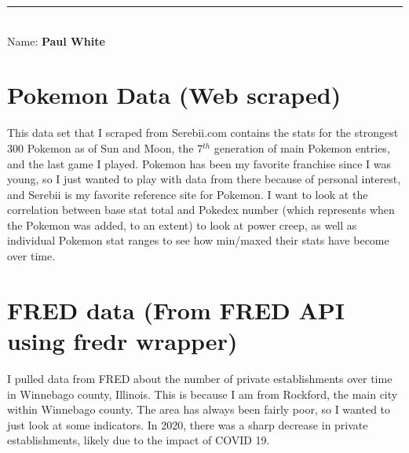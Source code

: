 \documentclass[11pt,a4paper]{article}
\newcommand{\student}{\textbf{Paul White}}
\begin{document}
\thispagestyle{empty}
\begin{center}
\end{center}
\noindent
\rule{17cm}{0.2cm}\\[0.3cm]
Name: \student 



\section{Pokemon Data (Web scraped)}
    This data set that I scraped from Serebii.com contains the stats for the strongest 300 Pokemon as of Sun and Moon, the 7$^{th}$ generation of main Pokemon entries, and the last game I played. Pokemon has been my favorite franchise since I was young, so I just wanted to play with data from there because of personal interest, and Serebii is my favorite reference site for Pokemon. I want to look at the correlation between base stat total and Pokedex number (which represents when the Pokemon was added, to an extent) to look at power creep, as well as individual Pokemon stat ranges to see how min/maxed their stats have become over time.

\section{FRED data (From FRED API using fredr wrapper)}
    I pulled data from FRED about the number of private establishments over time in Winnebago county, Illinois. This is because I am from Rockford, the main city within Winnebago county. The area has always been fairly poor, so I wanted to just look at some indicators. In 2020, there was a sharp decrease in private establishments, likely due to the impact of COVID 19.
    
\end{document}
